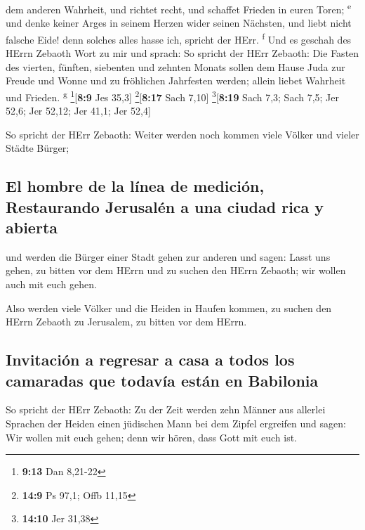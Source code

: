 dem anderen Wahrheit, und richtet recht, und schaffet Frieden in euren
Toren; \textsuperscript{e}  und denke keiner Arges in
seinem Herzen wider seinen Nächsten, und liebt nicht falsche Eide! denn
solches alles hasse ich, spricht der HErr. \textsuperscript{f}
 Und es geschah des HErrn Zebaoth Wort zu mir und sprach:
 So spricht der HErr Zebaoth: Die Fasten des vierten,
fünften, siebenten und zehnten Monats sollen dem Hause Juda zur Freude
und Wonne und zu fröhlichen Jahrfesten werden; allein liebet Wahrheit
und Frieden. \textsuperscript{g} \footnote{\textbf{9:13} Dan 8,21-22}{[}\textbf{8:9}
Jes 35,3{]} \footnote{\textbf{14:9} Ps 97,1; Offb 11,15}{[}\textbf{8:17}
Sach 7,10{]} \footnote{\textbf{14:10} Jer 31,38}{[}\textbf{8:19} Sach
7,3; Sach 7,5; Jer 52,6; Jer 52,12; Jer 41,1; Jer 52,4{]}

 So spricht der HErr Zebaoth: Weiter werden noch kommen
viele Völker und vieler Städte Bürger;

\hypertarget{el-hombre-de-la-luxednea-de-mediciuxf3n-restaurando-jerusaluxe9n-a-una-ciudad-rica-y-abierta}{%
\subsection{El hombre de la línea de medición, Restaurando Jerusalén a
una ciudad rica y
abierta}\label{el-hombre-de-la-luxednea-de-mediciuxf3n-restaurando-jerusaluxe9n-a-una-ciudad-rica-y-abierta}}

 und werden die Bürger einer Stadt gehen zur anderen und
sagen: Lasst uns gehen, zu bitten vor dem HErrn und zu suchen den HErrn
Zebaoth; wir wollen auch mit euch gehen.

 Also werden viele Völker und die Heiden in Haufen
kommen, zu suchen den HErrn Zebaoth zu Jerusalem, zu bitten vor dem
HErrn.

\hypertarget{invitaciuxf3n-a-regresar-a-casa-a-todos-los-camaradas-que-todavuxeda-estuxe1n-en-babilonia}{%
\subsection{Invitación a regresar a casa a todos los camaradas que
todavía están en
Babilonia}\label{invitaciuxf3n-a-regresar-a-casa-a-todos-los-camaradas-que-todavuxeda-estuxe1n-en-babilonia}}

 So spricht der HErr Zebaoth: Zu der Zeit werden zehn
Männer aus allerlei Sprachen der Heiden einen jüdischen Mann bei dem
Zipfel ergreifen und sagen: Wir wollen mit euch gehen; denn wir hören,
dass Gott mit euch ist.

